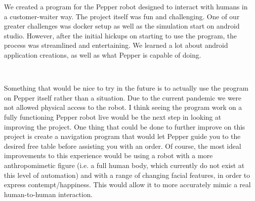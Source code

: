 \documentclass[12pt, letterpaper, twoside]{article}
\begin{document}
We created a program for the Pepper robot designed to interact with humans in a customer-waiter way. The project itself was fun and challenging. One of our greater challenges was docker setup as well as the simulation start on android studio. However, after the initial hickups on starting to use the program, the process was streamlined and entertaining. We learned a lot about android application creations, as well as what Pepper is capable of doing. 

\

Something that would be nice to try in the future is to actually use the program on Pepper itself rather than a situation. Due to the current pandemic we were not allowed physical access to the robot. I think seeing the program work on a fully functioning Pepper robot live would be the next step in looking at improving the project. One thing that could be done to further improve on this project is create a navigation program that would let Pepper guide you to the desired free table before assisting you with an order. Of course, the most ideal improvements to this experience would be using a robot with a more anthropomimetic figure (i.e. a full human body, which currently do not exist at this level of automation) and with a range of changing facial features, in order to express contempt/happiness. This would allow it to more accurately mimic a real human-to-human interaction.  

\




\newpage

\nocite{*}
\printbibliography[heading=bibintoc,title={References}]
\end{document}
